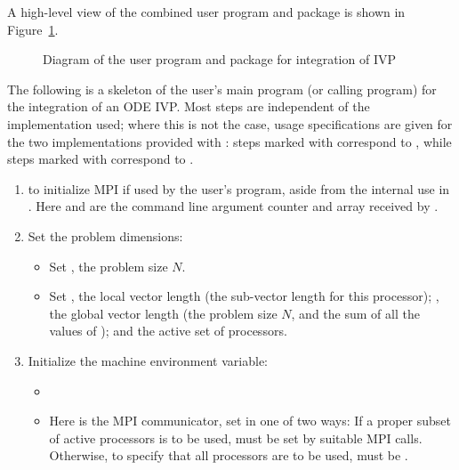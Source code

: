 A high-level view of the combined user program and {\cvodes} package is
shown in Figure~\ref{f:sim_overview}.
\begin{figure}
\centerline{}
\caption {Diagram of the user program and 
  {\cvodes} package for integration of IVP}\label{f:sim_overview}
\end{figure}
The following is a skeleton of the user's main program (or calling
program) for the integration of an ODE IVP. Most steps are independent of the {\nvector}
implementation used; where this is not the case, usage specifications are given for the
two implementations provided with {\cvodes}: steps marked with {\p} correspond to 
{\nvecp}, while steps marked with {\s} correspond to {\nvecs}.
%
\begin{enumerate}
  
\item {\p}
   to initialize MPI if used by
  the user's program, aside from the internal use in {\nvecp}.  
  Here  and  are the command line argument 
  counter and array received by .
  
\item Set the problem dimensions:
  \begin{itemize}
  \item {\s}
    Set , the problem size $N$.
  \item {\p} 
    Set , the local vector length (the sub-vector
    length for this processor); , the global vector length (the
    problem size $N$, and the sum of all the values of );
    and the active set of processors.
  \end{itemize}
  
\item Initialize the machine environment variable:
  \begin{itemize}
  \item {\s}
  \item {\p}
    Here  is the MPI communicator, set in one of two ways: 
    If a proper subset of active processors is to be used,  
    must be set by suitable MPI calls. Otherwise, to specify that all 
    processors are to be used,  must be .
  \end{itemize}
  

\end{enumerate}
